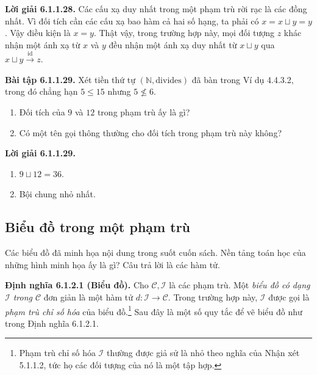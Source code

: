 \noindent\textbf{Lời giải 6.1.1.28.}\keepwithnext
Các cấu xạ duy nhất trong một phạm trù rời rạc là các đồng nhất. Vì đối tích cần các cấu xạ bao hàm cả hai số hạng, ta phải có $x=x\sqcup y=y$. Vậy điều kiện là $x=y$. Thật vậy, trong trường hợp này, mọi đối tượng $z$ khác nhận một ánh xạ từ $x$ và $y$ đều nhận một ánh xạ duy nhất từ $x\sqcup y$ qua $x\sqcup y\xrightarrow{\mathrm{id}}z$.

\noindent\textbf{Bài tập 6.1.1.29.} Xét tiền thứ tự $(\mathbb N,\mathrm{divides})$ đã bàn trong Ví dụ 4.4.3.2, trong đó chẳng hạn $5\le15$ nhưng $5\not\le6$.
\begin{enumerate}[label=\alph*.]\item Đối tích của $9$ và $12$ trong phạm trù ấy là gì?\item Có một tên gọi thông thường cho đối tích trong phạm trù này không?\end{enumerate}
\noindent\textbf{Lời giải 6.1.1.29.}\keepwithnext
\begin{enumerate}[label=\alph*.]\item $9\sqcup12=36$.\item Bội chung nhỏ nhất.\end{enumerate}

\subsection{Biểu đồ trong một phạm trù}
Các biểu đồ đã minh họa nội dung trong suốt cuốn sách. Nền tảng toán học của những hình minh họa ấy là gì? Câu trả lời là các hàm tử.

\noindent\textbf{Định nghĩa 6.1.2.1 (Biểu đồ).} Cho $\mathcal C,\mathcal I$ là các phạm trù. Một \emph{biểu đồ có dạng $\mathcal I$ trong $\mathcal C$} đơn giản là một hàm tử $d:\mathcal I\to\mathcal C$. Trong trường hợp này, $\mathcal I$ được gọi là \emph{phạm trù chỉ số hóa} của biểu đồ.\footnote{Phạm trù chỉ số hóa $\mathcal I$ thường được giả sử là nhỏ theo nghĩa của Nhận xét 5.1.1.2, tức họ các đối tượng của nó là một tập hợp.}
Sau đây là một số quy tắc để vẽ biểu đồ như trong Định nghĩa 6.1.2.1.

